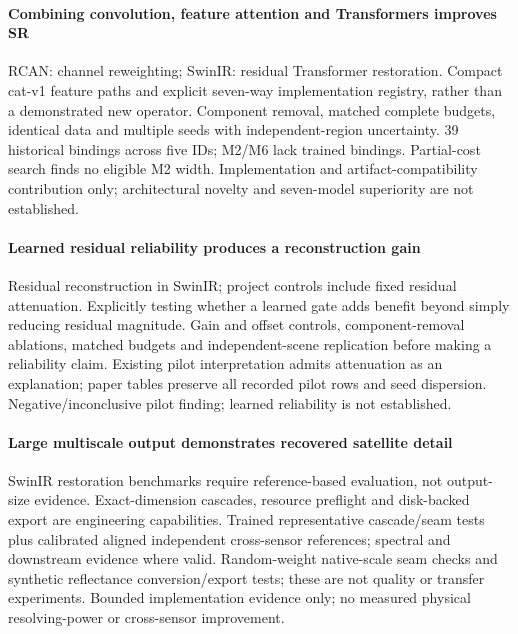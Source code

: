 \paragraph{Combining convolution, feature attention and Transformers improves SR} RCAN: channel reweighting; SwinIR: residual Transformer restoration. Compact cat-v1 feature paths and explicit seven-way implementation registry, rather than a demonstrated new operator. Component removal, matched complete budgets, identical data and multiple seeds with independent-region uncertainty. 39 historical bindings across five IDs; M2/M6 lack trained bindings. Partial-cost search finds no eligible M2 width. Implementation and artifact-compatibility contribution only; architectural novelty and seven-model superiority are not established.

\paragraph{Learned residual reliability produces a reconstruction gain} Residual reconstruction in SwinIR; project controls include fixed residual attenuation. Explicitly testing whether a learned gate adds benefit beyond simply reducing residual magnitude. Gain and offset controls, component-removal ablations, matched budgets and independent-scene replication before making a reliability claim. Existing pilot interpretation admits attenuation as an explanation; paper tables preserve all recorded pilot rows and seed dispersion. Negative/inconclusive pilot finding; learned reliability is not established.

\paragraph{Large multiscale output demonstrates recovered satellite detail} SwinIR restoration benchmarks require reference-based evaluation, not output-size evidence. Exact-dimension cascades, resource preflight and disk-backed export are engineering capabilities. Trained representative cascade/seam tests plus calibrated aligned independent cross-sensor references; spectral and downstream evidence where valid. Random-weight native-scale seam checks and synthetic reflectance conversion/export tests; these are not quality or transfer experiments. Bounded implementation evidence only; no measured physical resolving-power or cross-sensor improvement.

